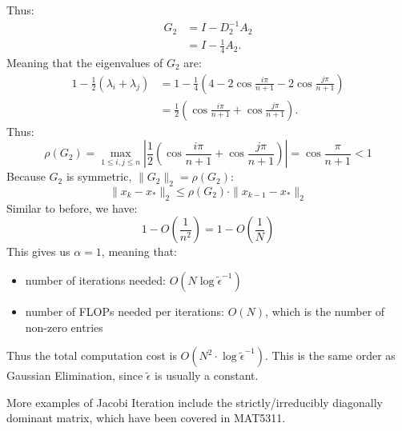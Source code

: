 \documentclass[../main/main.tex]{subfiles}
\begin{document}
Thus:
\begin{align*}
  G_{2} &= I - D_{2}^{-1} A_{2}\\
  &= I - \frac{1}{4} A_2
  .\end{align*}
Meaning that the eigenvalues of $G_{2}$ are:
\begin{align*}
  1-\frac{1}{2}(\lambda_{i}+\lambda_{j}) &= 1- \frac{1}{4}\left(4-2\cos \frac{i\pi}{n+1} -2\cos\frac{j\pi}{n+1} \right) \\
  &= \frac{1}{2} \left(\cos \frac{i\pi}{n+1}+\cos \frac{j\pi}{n+1}  \right)
    .\end{align*}
  Thus: \[
    \rho(G_2) = \max_{1\leq i,j \leq n} \left|\frac{1}{2} \left(\cos \frac{i\pi}{n+1}+\cos \frac{j\pi}{n+1}  \right)\right| = \cos \frac{\pi}{n+1} < 1
  \] Because $G_{2}$ is symmetric, $\|G_{2}\|_{2} = \rho(G_{2})$: \[
\|x_{k}-x_{*}\|_{2}\leq \rho(G_{2})\cdot \|x_{k-1}-x_{*}\|_{2}
\] Similar to before, we have: \[
1-O\left(\frac{1}{n^2}\right)= 1-O\left(\frac{1}{N}\right)
\]
This gives us $\alpha = 1$, meaning that:
\begin{itemize}
\item number of iterations needed: $O(N \log \tilde{\epsilon}^{-1})$
\item number of FLOPs needed per iterations: $O(N)$, which is the number of non-zero entries
\end{itemize}
Thus the total computation cost is $O(N^2 \cdot \log\tilde{\epsilon}^{-1})$. This is the same order as Gaussian Elimination, since $\tilde{\epsilon}$ is usually a constant.

\begin{remark}
More examples of Jacobi Iteration include the strictly/irreducibly diagonally dominant matrix, which have been covered in MAT5311.
\end{remark}
\end{document}
